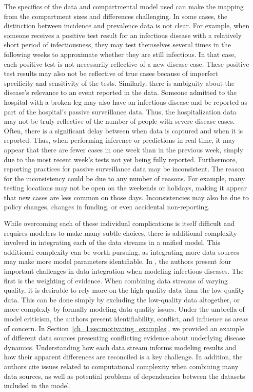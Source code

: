 The specifics of the data and compartmental model used can make the mapping from the compartment sizes and differences challenging.
In some cases, the distinction between incidence and prevalence data is not clear.
For example, when someone receives a positive test result for an infectious disease with a relatively short period of infectiousness, they may test themselves several times in the following weeks to approximate whether they are still infectious.
In that case, each positive test is not necessarily reflective of a new disease case.
These positive test results may also not be reflective of true cases because of imperfect specificity and sensitivity of the tests.
Similarly, there is ambiguity about the disease's relevance to an event reported in the data.
Someone admitted to the hospital with a broken leg may also have an infectious disease and be reported as part of the hospital's passive surveillance data.
Thus, the hospitalization data may not be truly reflective of the number of people with severe disease cases.
Often, there is a significant delay between when data is captured and when it is reported.
Thus, when performing inference or predictions in real time, it may appear that there are fewer cases in one week than in the previous week, simply due to the most recent week's tests not yet being fully reported.
Furthermore, reporting practices for passive surveillance data may be inconsistent.
The reason for the inconsistency could be due to any number of reasons.
For example, many testing locations may not be open on the weekends or holidays, making it appear that new cases are less common on those days.
Inconsistencies may also be due to policy changes, changes in funding, or even accidental non-reporting.

While overcoming each of these individual complications is itself difficult and requires modelers to make many subtle choices, there is additional complexity involved in integrating each of the data streams in a unified model.
This additional complexity can be worth pursuing, as integrating more data sources may make more model parameters identifiable.
In \citet{DeAngelis2015four}, the authors present four important challenges in data integration when modeling infectious diseases.
The first is the weighting of evidence.
When combining data streams of varying quality, it is desirable to rely more on the high-quality data than the low-quality data.
This can be done simply by excluding the low-quality data altogether, or more complexly by formally modeling data quality issues.
Under the umbrella of model criticism, the authors present identifiability, conflict, and influence as areas of concern.
In Section~\ref{ch_1:sec:motivating_examples}, we provided an example of different data sources presenting conflicting evidence about underlying disease dynamics.
Understanding how each data stream informs modeling results and how their apparent differences are reconciled is a key challenge.
In addition, the authors cite issues related to computational complexity when combining many data sources, as well as potential problems of dependencies between the datasets included in the model.

